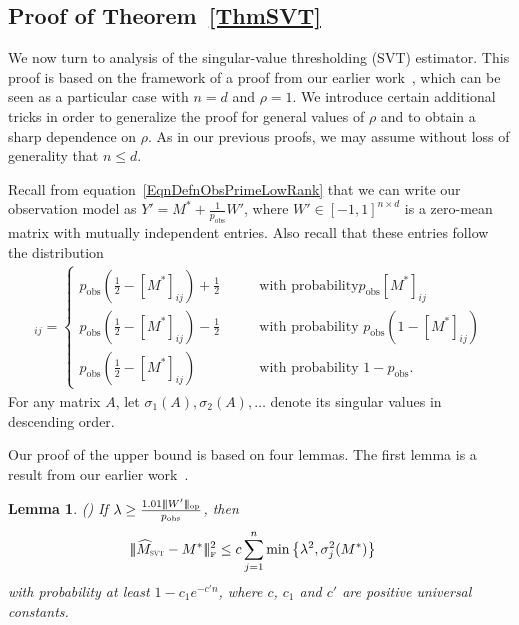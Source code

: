 \documentclass[11pt, hidelinks]{article} %
\newcommand{\arxiv}[1]{#1}
\newcommand{\nips}[1]{}
\newtheorem{lemma}{Lemma}
\newcommand{\singularvalue}[2]{\sigma_{#1}(#2)}
\newcommand{\matsnorm}[2]{|\!|\!| #1 | \! | \!|_{{#2}}}
\newcommand{\opnorm}[1]{\ensuremath{\matsnorm{#1}{\mbox{\tiny{op}}}}}
\newcommand{\frobnorm}[1]{\ensuremath{\matsnorm{#1}{\mbox{\tiny{F}}}}}
\newcommand{\half}{\ensuremath{{\frac{1}{2}}}}
\newcommand{\numrows}{n}
\newcommand{\numcols}{d}
\newcommand{\plaincon}{c}
\newcommand{\wtmatrix}{M}
\newcommand{\wtstar}{\wtmatrix^*}
\newcommand{\wthat}{\widehat{\wtmatrix}}
\newcommand{\pp}{\ensuremath{p_{\mathrm{obs}}}}
\newcommand{\obs}{\ensuremath{Y}}
\newcommand{\permrank}{\rho}
\newcommand{\noise}{W}
\newcommand{\regpar}{\ensuremath{\lambda}}
\newcommand{\wthatSVT}{\wthat_{\mbox{\scalebox{.5}{SVT}}}}
\begin{document}
\subsection{Proof of Theorem~\ref{ThmSVT}}

We now turn to analysis of the singular-value thresholding (SVT)
estimator.  This proof is based on the framework of a proof from our
earlier work~\cite[Theorem 2]{shah2015stochastically}, which can be
seen as a particular case with $\numrows = \numcols$ and $\permrank =
1$. We introduce certain additional tricks in order to generalize the
proof for general values of $\permrank$ and to obtain a sharp
dependence on $\permrank$.  As in our previous proofs, we may assume
without loss of generality that $\numrows \leq \numcols$.

Recall from equation~\eqref{EqnDefnObsPrimeLowRank} that we can write our observation model as $\obs' = \wtstar + \frac{1}{\pp} \noise'$,
where $\noise' \in [-1,1]^{\numrows \times \numcols}$ is a zero-mean matrix
with mutually independent entries.  Also recall
that these entries follow the distribution
\begin{align}
[\noise']_{ij} = 
\begin{cases} \pp(
\half - [\wtstar]_{ij}) + \frac{1}{2} & \qquad \mbox{with probability
} \pp [\wtstar]_{ij}\\ 
%
\pp (\half - [\wtstar]_{ij}) - \frac{1}{2} & \qquad \mbox{with
	probability } \pp (1-[\wtstar]_{ij})\\ 
%
\pp (\half - [\wtstar]_{ij}) & \qquad \mbox{with probability } 1-\pp .
\end{cases}
\label{EqnDefnWprimePartialLowRankRepeat}
\end{align}
%
For any matrix $A$, let $\singularvalue{1}{A}, \singularvalue{2}{A},\ldots$ denote its singular values in descending order. 

Our proof of the upper bound is based on four lemmas. The first lemma
is a result from \arxiv{our earlier work}\nips{the paper}~\cite{shah2015stochastically}.
%
\begin{lemma}(\cite[Lemma 3]{shah2015stochastically})
  \label{LemSTSVD}
  If $\regpar \geq \frac{1.01 \opnorm{\noise'}}{\pp}$, then
  \begin{align*}
    \frobnorm{\wthatSVT - \wtstar}^2 & \leq \plaincon \sum_{j=1}^\numrows \min \big \{ \regpar^2, \sigma_j^2(\wtstar) \big \}
  \end{align*}
  with probability at least $1-c_1 e^{-c' \numrows}$, where $\plaincon$, $c_1$ and $c'$ are positive universal constants.
\end{lemma}
\end{document}
